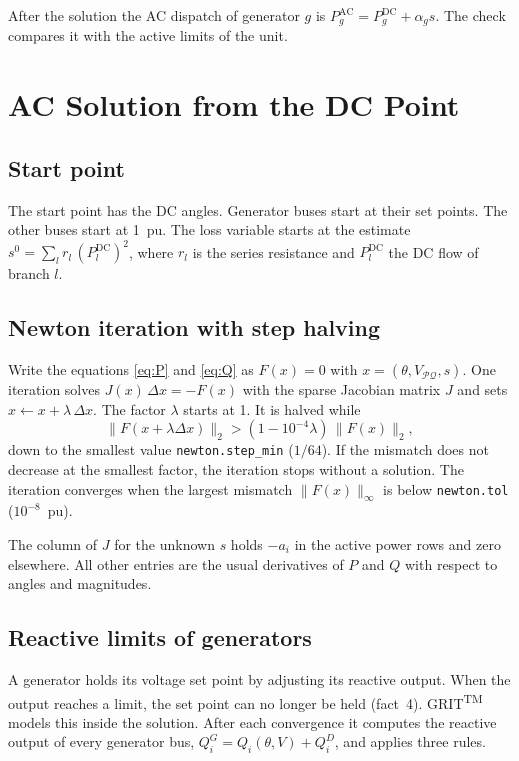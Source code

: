 \documentclass[a4paper,11pt]{article}
\newcommand{\TM}{\textsuperscript{TM}}
\newcommand{\GRIT}{GRIT\TM}
\newcommand{\opt}[1]{\texttt{#1}}
\begin{document}
After the solution the AC dispatch of generator $g$ is $P^{\mathrm{AC}}_g = P^{\mathrm{DC}}_g + \alpha_g s$. The check compares it with the active limits of the unit.

\section{AC Solution from the DC Point}\label{sec:newton}

\subsection{Start point}

The start point has the DC angles. Generator buses start at their set points. The other buses start at 1~pu. The loss variable starts at the estimate $s^0=\sum_l r_l \,(P^{\mathrm{DC}}_l)^2$, where $r_l$ is the series resistance and $P^{\mathrm{DC}}_l$ the DC flow of branch $l$.

\subsection{Newton iteration with step halving}

Write the equations \eqref{eq:P} and \eqref{eq:Q} as $F(x)=0$ with $x=(\theta, V_{\mathcal{PQ}}, s)$. One iteration solves $J(x)\,\Delta x = -F(x)$ with the sparse Jacobian matrix $J$ and sets $x \leftarrow x + \lambda\,\Delta x$. The factor $\lambda$ starts at 1. It is halved while
\[
\|F(x+\lambda\Delta x)\|_2 > (1-10^{-4}\lambda)\,\|F(x)\|_2 ,
\]
down to the smallest value \opt{newton.step\_min} ($1/64$). If the mismatch does not decrease at the smallest factor, the iteration stops without a solution. The iteration converges when the largest mismatch $\|F(x)\|_\infty$ is below \opt{newton.tol} ($10^{-8}$~pu).

The column of $J$ for the unknown $s$ holds $-a_i$ in the active power rows and zero elsewhere. All other entries are the usual derivatives of $P$ and $Q$ with respect to angles and magnitudes.

\subsection{Reactive limits of generators}\label{sec:qlim}

A generator holds its voltage set point by adjusting its reactive output. When the output reaches a limit, the set point can no longer be held (fact~4). \GRIT{} models this inside the solution. After each convergence it computes the reactive output of every generator bus, $Q^G_i = Q_i(\theta,V)+Q^D_i$, and applies three rules.
\end{document}
